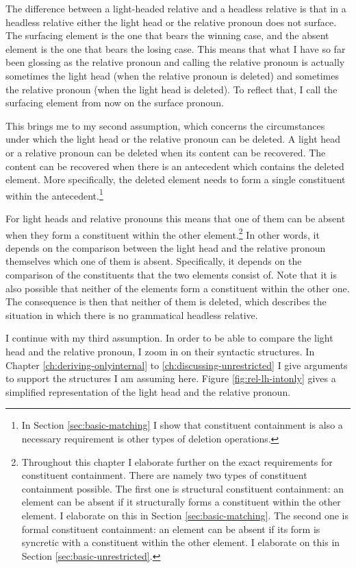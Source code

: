 The difference between a light-headed relative and a headless relative is that in a headless relative either the light head or the relative pronoun does not surface.
The surfacing element is the one that bears the winning case, and the absent element is the one that bears the losing case. This means that what I have so far been glossing as the relative pronoun and calling the relative pronoun is actually sometimes the light head (when the relative pronoun is deleted) and sometimes the relative pronoun (when the light head is deleted). To reflect that, I call the surfacing element from now on the surface pronoun.

This brings me to my second assumption, which concerns the circumstances under which the light head or the relative pronoun can be deleted. A light head or a relative pronoun can be deleted when its content can be recovered. The content can be recovered when there is an antecedent which contains the deleted element. More specifically, the deleted element needs to form a single constituent within the antecedent.\footnote{
In Section \ref{sec:basic-matching} I show that constituent containment is also a necessary requirement is other types of deletion operations.
}

For light heads and relative pronouns this means that one of them can be absent when they form a constituent within the other element.\footnote{ Throughout this chapter I elaborate further on the exact requirements for constituent containment. There are namely two types of constituent containment possible. The first one is structural constituent containment: an element can be absent if it structurally forms a constituent within the other element. I elaborate on this in Section \ref{sec:basic-matching}. The second one is formal constituent containment: an element can be absent if its form is syncretic with a constituent within the other element. I elaborate on this in Section \ref{sec:basic-unrestricted}.}
In other words, it depends on the comparison between the light head and the relative pronoun themselves which one of them is absent. Specifically, it depends on the comparison of the constituents that the two elements consist of.
Note that it is also possible that neither of the elements form a constituent within the other one. The consequence is then that neither of them is deleted, which describes the situation in which there is no grammatical headless relative.

I continue with my third assumption.
In order to be able to compare the light head and the relative pronoun, I zoom in on their syntactic structures. In Chapter \ref{ch:deriving-onlyinternal} to \ref{ch:discussing-unrestricted} I give arguments to support the structures I am assuming here. Figure \ref{fig:rel-lh-intonly} gives a simplified representation of the light head and the relative pronoun.

